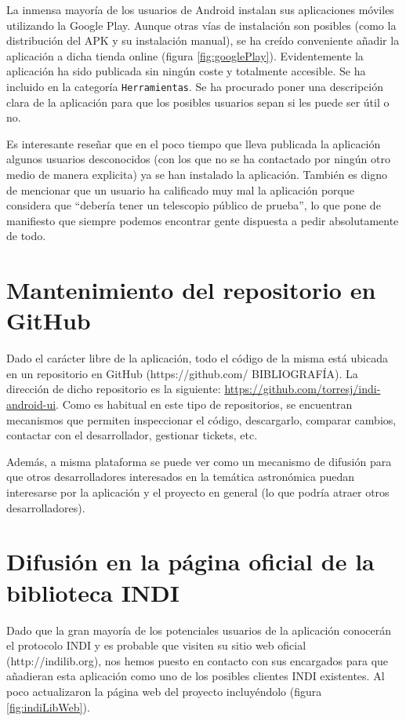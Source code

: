 La inmensa mayoría de los usuarios de Android instalan sus aplicaciones móviles utilizando la Google Play. Aunque otras vías de instalación son posibles (como la distribución del APK y su instalación manual), se ha creído conveniente añadir la aplicación a dicha tienda online (figura \ref{fig:googlePlay}). Evidentemente la aplicación ha sido publicada sin ningún coste y totalmente accesible. Se ha incluido en la categoría \texttt{Herramientas}. Se ha procurado poner una descripción clara de la aplicación para que los posibles usuarios sepan si les puede ser útil o no.

Es interesante reseñar que en el poco tiempo que lleva publicada la aplicación algunos usuarios desconocidos (con los que no se ha contactado por ningún otro medio de manera explicita) ya se han instalado la aplicación. También es digno de mencionar que un usuario ha calificado muy mal la aplicación porque considera que ``debería tener un telescopio público de prueba'', lo que pone de manifiesto que siempre podemos encontrar gente dispuesta a pedir absolutamente de todo.

\section{Mantenimiento del repositorio en GitHub}

Dado el carácter libre de la aplicación, todo el código de la misma está ubicada en un repositorio en GitHub (https://github.com/ BIBLIOGRAFÍA). La dirección de dicho repositorio es la siguiente: \href{https://github.com/torresj/indi-android-ui}{https://github.com/torresj/indi-android-ui}. Como es habitual en este tipo de repositorios, se encuentran mecanismos que permiten inspeccionar el código, descargarlo, comparar cambios, contactar con el desarrollador, gestionar tickets, etc.

Además, a misma plataforma se puede ver como un mecanismo de difusión para que otros desarrolladores interesados en la temática astronómica puedan interesarse por la aplicación y el proyecto en general (lo que podría atraer otros desarrolladores).

\section{Difusión en la página oficial de la biblioteca INDI}

Dado que la gran mayoría de los potenciales usuarios de la aplicación conocerán el protocolo INDI y es probable que visiten su sitio web oficial (http://indilib.org), nos hemos puesto en contacto con sus encargados para que añadieran esta aplicación como uno de los posibles clientes INDI existentes. Al poco actualizaron la página web del proyecto incluyéndolo (figura \ref{fig:indiLibWeb}).


